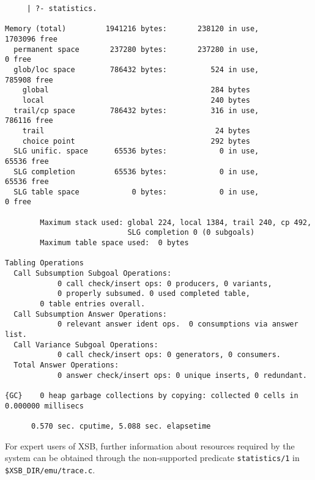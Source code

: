 \begin{description}
    {\footnotesize
     \begin{verbatim}
     | ?- statistics.

Memory (total)         1941216 bytes:       238120 in use,      1703096 free
  permanent space       237280 bytes:       237280 in use,            0 free
  glob/loc space        786432 bytes:          524 in use,       785908 free
    global                                     284 bytes
    local                                      240 bytes
  trail/cp space        786432 bytes:          316 in use,       786116 free
    trail                                       24 bytes
    choice point                               292 bytes
  SLG unific. space      65536 bytes:            0 in use,        65536 free
  SLG completion         65536 bytes:            0 in use,        65536 free
  SLG table space            0 bytes:            0 in use,            0 free

        Maximum stack used: global 224, local 1384, trail 240, cp 492,
                            SLG completion 0 (0 subgoals)
        Maximum table space used:  0 bytes

Tabling Operations
  Call Subsumption Subgoal Operations:
            0 call check/insert ops: 0 producers, 0 variants,
            0 properly subsumed. 0 used completed table, 
	    0 table entries overall.
  Call Subsumption Answer Operations:
            0 relevant answer ident ops.  0 consumptions via answer list.
  Call Variance Subgoal Operations: 
            0 call check/insert ops: 0 generators, 0 consumers.
  Total Answer Operations: 
            0 answer check/insert ops: 0 unique inserts, 0 redundant.

{GC}    0 heap garbage collections by copying: collected 0 cells in 0.000000 millisecs

      0.570 sec. cputime, 5.088 sec. elapsetime 
\end{verbatim}} 
     For expert users of XSB, further information about resources
     required by the system can be obtained through the non-supported
     predicate {\tt statistics/1} in {\tt \$XSB\_DIR/emu/trace.c}.


\end{description}
